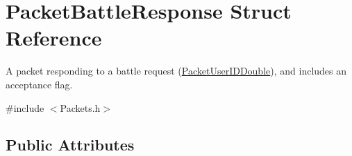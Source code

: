 \hypertarget{struct_packet_battle_response}{\section{Packet\-Battle\-Response Struct Reference}
\label{struct_packet_battle_response}
}


A packet responding to a battle request (\hyperlink{struct_packet_user_i_d_double}{Packet\-User\-I\-D\-Double}), and includes an acceptance flag.  




{\ttfamily \#include $<$Packets.\-h$>$}

\subsection*{Public Attributes}
